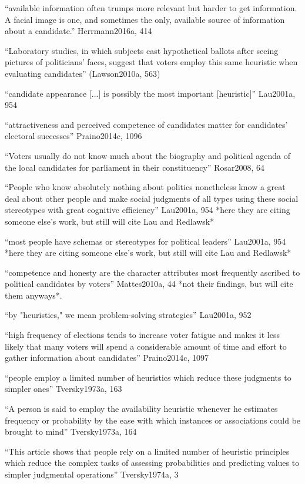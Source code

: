 
``available information often trumps more relevant but harder to get information. A facial image is one, and sometimes the only, available source of information about a candidate.'' Herrmann2016a, 414

``Laboratory studies, in which subjects cast hypothetical ballots after seeing pictures of politicians' faces, suggest that voters employ this same heuristic when evaluating candidates'' (Lawson2010a, 563)

``candidate appearance [...] is possibly the most important [heuristic]'' Lau2001a, 954

``attractiveness and perceived competence of candidates matter for candidates’ electoral successes'' Praino2014c, 1096

``Voters usually do not know much about the biography and political agenda of the local candidates for parliament in their constituency'' Rosar2008, 64

``People who know absolutely nothing about politics nonetheless know a great deal about other people and make social judgments of all types using these social stereotypes with great cognitive efficiency'' Lau2001a, 954 *here they are citing someone else's work, but still will cite Lau and Redlawsk*

``most people have schemas or stereotypes for political leaders'' Lau2001a, 954 *here they are citing someone else's work, but still will cite Lau and Redlawsk*

``competence and honesty are the character attributes most frequently ascribed to political candidates by voters'' Mattes2010a, 44 *not their findings, but will cite them anyways*.

``by "heuristics," we mean problem-solving strategies'' Lau2001a, 952

``high frequency of elections tends to increase voter fatigue and makes it less likely that many voters will spend a considerable amount of time and effort to gather information about candidates'' Praino2014c, 1097

``people employ a limited number of heuristics which reduce these judgments to simpler ones'' Tversky1973a, 163

``A person is said to employ the availability heuristic whenever he estimates frequency or probability by the ease with which instances or associations could be brought to mind'' Tversky1973a, 164

``This article shows that people rely on a limited number of heuristic principles which reduce the complex tasks of assessing probabilities and predicting values to simpler judgmental operations'' Tversky1974a, 3

